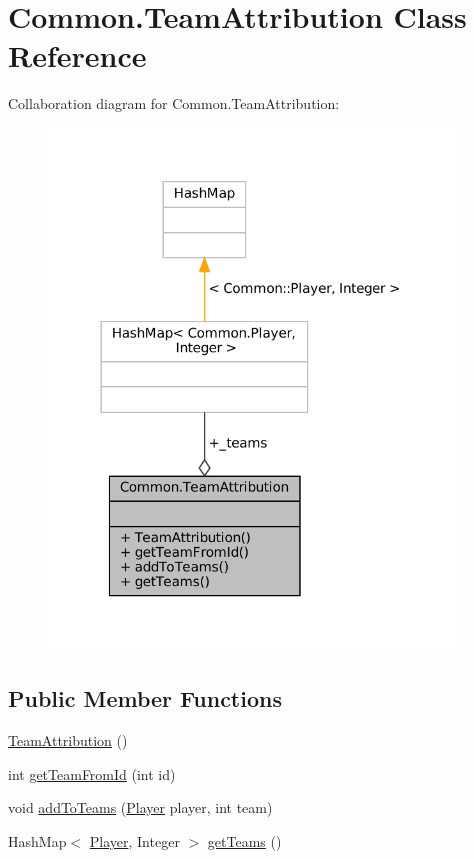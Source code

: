 \hypertarget{classCommon_1_1TeamAttribution}{}\section{Common.\+Team\+Attribution Class Reference}
\label{classCommon_1_1TeamAttribution}


Collaboration diagram for Common.\+Team\+Attribution\+:
\nopagebreak
\begin{figure}[H]
\begin{center}
\leavevmode
\includegraphics[width=306pt]{classCommon_1_1TeamAttribution__coll__graph}
\end{center}
\end{figure}
\subsection*{Public Member Functions}
\begin{DoxyCompactItemize}
\item 
\mbox{\hyperlink{classCommon_1_1TeamAttribution_ae9e3f8d680bd877d243b2bd1261e915f}{Team\+Attribution}} ()
\item 
int \mbox{\hyperlink{classCommon_1_1TeamAttribution_a4dc4bc10ccb136c5859a29210dca6115}{get\+Team\+From\+Id}} (int id)
\item 
void \mbox{\hyperlink{classCommon_1_1TeamAttribution_aa21f38f5bb27527934d518ea68120f56}{add\+To\+Teams}} (\mbox{\hyperlink{classCommon_1_1Player}{Player}} player, int team)
\item 
Hash\+Map$<$ \mbox{\hyperlink{classCommon_1_1Player}{Player}}, Integer $>$ \mbox{\hyperlink{classCommon_1_1TeamAttribution_ae2b14573fa95f73bf00ca7df017a9b2c}{get\+Teams}} ()
\end{DoxyCompactItemize}
